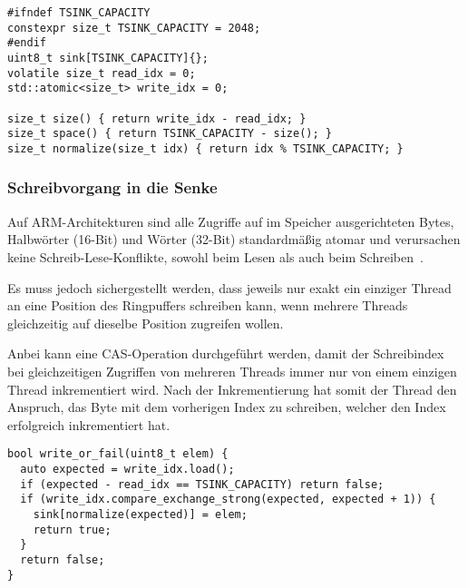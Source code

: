 \begin{code}
\begin{verbatim}
#ifndef TSINK_CAPACITY
constexpr size_t TSINK_CAPACITY = 2048;
#endif
uint8_t sink[TSINK_CAPACITY]{};
volatile size_t read_idx = 0;
std::atomic<size_t> write_idx = 0;

size_t size() { return write_idx - read_idx; }
size_t space() { return TSINK_CAPACITY - size(); }
size_t normalize(size_t idx) { return idx % TSINK_CAPACITY; }
\end{verbatim}
\end{code}

\subsubsection{Schreibvorgang in die Senke}

Auf ARM-Architekturen sind alle Zugriffe auf im Speicher ausgerichteten Bytes,
Halbwörter (16-Bit) und Wörter (32-Bit) standardmäßig atomar und verursachen
keine Schreib-Lese-Konflikte, sowohl beim Lesen als auch beim Schreiben~\cite[S.
A3-79]{ARM_DDI0403_EE}.

Es muss jedoch sichergestellt werden, dass jeweils nur exakt ein einziger Thread
an eine Position des Ringpuffers schreiben kann, wenn mehrere Threads
gleichzeitig auf dieselbe Position zugreifen wollen.

Anbei kann eine \ac{CAS}-Operation durchgeführt werden, damit der Schreibindex
bei gleichzeitigen Zugriffen von mehreren Threads immer nur von einem einzigen
Thread inkrementiert wird. Nach der Inkrementierung hat somit der Thread den
Anspruch, das Byte mit dem vorherigen Index zu schreiben, welcher den Index
erfolgreich inkrementiert hat.

\begin{code}
\begin{verbatim}
bool write_or_fail(uint8_t elem) {
  auto expected = write_idx.load();
  if (expected - read_idx == TSINK_CAPACITY) return false;
  if (write_idx.compare_exchange_strong(expected, expected + 1)) {
    sink[normalize(expected)] = elem;
    return true;
  }
  return false;
}
\end{verbatim}
\end{code}

